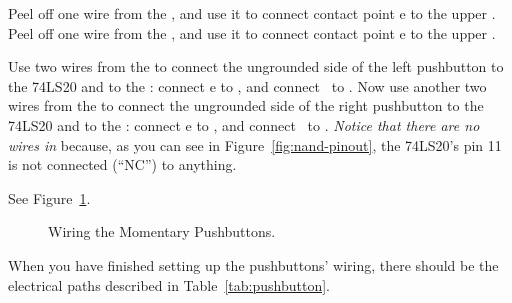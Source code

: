 Peel off one wire from the \rainbow, and use it to connect contact point e to the upper \ground.
Peel off one wire from the \rainbow, and use it to connect contact point e to the upper \ground.

Use two wires from the \rainbow to connect the ungrounded side of the left pushbutton to the 74LS20 and to the \developmentboard:
connect e to \leftbuttontarget, and connect \mculeftbuttonfrom\ to \mculeftbuttonpoint.
Now use another two wires from the \rainbow to connect the ungrounded side of the right pushbutton to the 74LS20 and to the \developmentboard:
connect e to \rightbuttontarget, and connect \mcurightbuttonfrom\ to \mcurightbuttonpoint.
\textit{Notice that there are no wires in \nanduppernc} because, as you can see in Figure~\ref{fig:nand-pinout}, the 74LS20's pin 11 is not connected (``NC'') to anything.

See Figure~\ref{fig:pushbutton-wired}.

\begin{figure}%
    \centering
%
%
    \caption{Wiring the Momentary Pushbuttons.
        \label{fig:pushbutton-wired}}
\end{figure}

When you have finished setting up the pushbuttons' wiring, there should be the electrical paths described in Table~\ref{tab:pushbutton}.

